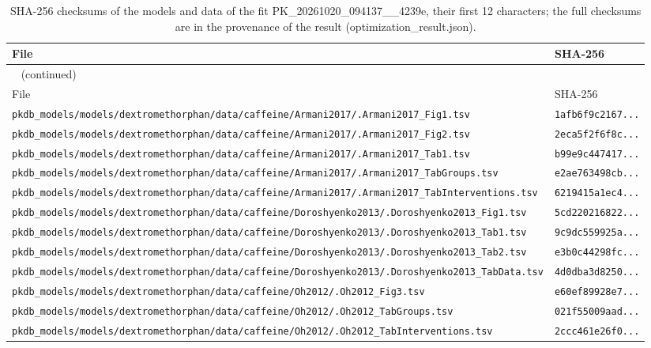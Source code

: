 \documentclass{article}
\begin{document}
\begin{longtable}{ll}
\caption{SHA-256 checksums of the models and data of the fit PK\_20261020\_094137\_\_4239e, their first 12 characters; the full checksums are in the provenance of the result (optimization\_result.json).}\label{tab:checksums:PK_20261020_094137__4239e} \\
\toprule
File & SHA-256 \\
\midrule
\endfirsthead
\multicolumn{2}{l}{\small\tablename~\thetable{} (continued)} \\
\toprule
File & SHA-256 \\
\midrule
\endhead
\bottomrule
\endlastfoot
\texttt{pkdb\_models/models/dextromethorphan/data/caffeine/Armani2017/.Armani2017\_Fig1.tsv} & \texttt{1afb6f9c2167...} \\
\texttt{pkdb\_models/models/dextromethorphan/data/caffeine/Armani2017/.Armani2017\_Fig2.tsv} & \texttt{2eca5f2f6f8c...} \\
\texttt{pkdb\_models/models/dextromethorphan/data/caffeine/Armani2017/.Armani2017\_Tab1.tsv} & \texttt{b99e9c447417...} \\
\texttt{pkdb\_models/models/dextromethorphan/data/caffeine/Armani2017/.Armani2017\_TabGroups.tsv} & \texttt{e2ae763498cb...} \\
\texttt{pkdb\_models/models/dextromethorphan/data/caffeine/Armani2017/.Armani2017\_TabInterventions.tsv} & \texttt{6219415a1ec4...} \\
\texttt{pkdb\_models/models/dextromethorphan/data/caffeine/Doroshyenko2013/.Doroshyenko2013\_Fig1.tsv} & \texttt{5cd220216822...} \\
\texttt{pkdb\_models/models/dextromethorphan/data/caffeine/Doroshyenko2013/.Doroshyenko2013\_Tab1.tsv} & \texttt{9c9dc559925a...} \\
\texttt{pkdb\_models/models/dextromethorphan/data/caffeine/Doroshyenko2013/.Doroshyenko2013\_Tab2.tsv} & \texttt{e3b0c44298fc...} \\
\texttt{pkdb\_models/models/dextromethorphan/data/caffeine/Doroshyenko2013/.Doroshyenko2013\_TabData.tsv} & \texttt{4d0dba3d8250...} \\
\texttt{pkdb\_models/models/dextromethorphan/data/caffeine/Oh2012/.Oh2012\_Fig3.tsv} & \texttt{e60ef89928e7...} \\
\texttt{pkdb\_models/models/dextromethorphan/data/caffeine/Oh2012/.Oh2012\_TabGroups.tsv} & \texttt{021f55009aad...} \\
\texttt{pkdb\_models/models/dextromethorphan/data/caffeine/Oh2012/.Oh2012\_TabInterventions.tsv} & \texttt{2ccc461e26f0...} \\

\end{longtable}
\end{document}
